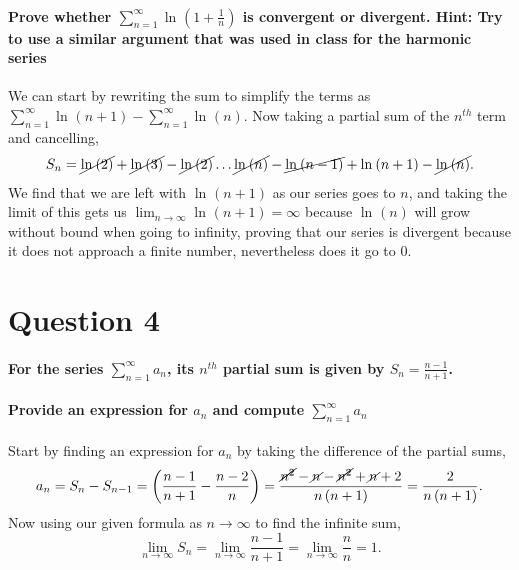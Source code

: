 \documentclass[a4paper]{article}
\begin{document}
\paragraph{Prove whether $ \sum_{ n=1 } ^{ \infty } \ln^{  } \left( 1+\frac{ 1 }{ n }  \right)  $ is convergent or divergent. Hint: Try to use a similar argument that was used in class for the harmonic series \\ }
We can start by rewriting the sum to simplify the terms as $ \sum_{ n=1 } ^{ \infty } \ln^{  } \left( n+1 \right) -\sum_{ n=1 } ^{ \infty } \ln^{  } \left( n \right)  $. Now taking a partial sum of the $ n^{ th } $ term and cancelling,
\begin{align*}
	S_n = \cancel{\ln^{  } \left( 2 \right)} + \cancel{ \ln^{  } \left( 3 \right)  } - \cancel{\ln^{  } \left( 2 \right)} \ldots \cancel{ \ln^{  } \left( n \right)  } - \cancel{ \ln^{  } \left( n-1 \right)  } + \ln^{  } \left( n+1 \right) - \cancel{ \ln^{  } \left( n \right)  }
.\end{align*}
We find that we are left with $ \ln^{  } \left( n+1 \right)  $ as our series goes to $ n $, and taking the limit of this gets us $ \lim_{ n \to \infty} \ln^{  } \left( n+1 \right) =\infty $ because $ \ln^{  } \left( n \right)  $ will grow without bound when going to infinity, proving that our series is divergent because it does not approach a finite number, nevertheless does it go to 0.
\section*{Question 4}%
\paragraph{For the series $ \sum_{ n=1 } ^{ \infty } a_n $, its $ n^{ th } $ partial sum is given by $ S_n = \frac{ n-1 }{ n+1 } $. \\ \\ Provide an expression for $ a_n $ and compute $ \sum_{ n=1 } ^{ \infty } a_n $\\}
Start by finding an expression for $ a_n $ by taking the difference of the partial sums,
\[
	a_n = S_n - S_{ n-1 } = \left( \frac{ n-1 }{ n+1 } - \frac{ n-2 }{ n }\right) = \frac{ \cancel{n^2} - \cancel{n} - \cancel{n^2}+\cancel{ n }+2 }{ n\left( n+1 \right)  } = \frac{ 2 }{ n\left( n+1 \right)  }
.\] 
Now using our given formula as $ n\to \infty $ to find the infinite sum,
\[
\lim_{ n \to \infty} S_n = \lim_{ n \to \infty} \frac{ n-1 }{ n+1 } = \lim_{ n \to \infty} \frac{ n }{ n } = 1
.\] 
\end{document}
